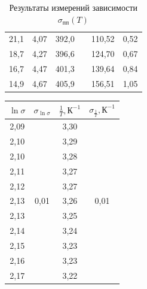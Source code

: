 \documentclass[a4paper,12pt]{report}
\begin{document}
\begin{table}[h!]
\begin{tabular}{|c|c|c|c|c|c|}
21,1      & 4,07 & 392,0 &                       & 110,52    & 0,52                   \\ \cline{1-3} \cline{5-6} 
18,7      & 4,27 & 396,6 &                       & 124,70    & 0,67                   \\ \cline{1-3} \cline{5-6} 
16,7      & 4,47 & 401,3 &                       & 139,64    & 0,84                   \\ \cline{1-3} \cline{5-6} 
14,9      & 4,67 & 405,9 &                       & 156,51    & 1,05                   \\ \hline
\end{tabular}
\caption{Результаты измерений зависимости $\sigma_{\text{пп}}(T)$}
\label{table_pp}
\end{table}

\begin{table}[h!]
\begin{tabular}{|c|c|c|c|}
\hline
$\ln\sigma$ & $\sigma_{\ln\sigma}$        & $\frac{1}{T}, \text{К}^{-1}$  & $\sigma_{\frac{1}{T}}, \text{К}^{-1}$              \\ \hline
2,09      & \multirow{36}{*}{0,01} & 3,30 & \multirow{36}{*}{0,01} \\ \cline{1-1} \cline{3-3}
2,10      &                        & 3,29 &                        \\ \cline{1-1} \cline{3-3}
2,10      &                        & 3,28 &                        \\ \cline{1-1} \cline{3-3}
2,11      &                        & 3,27 &                        \\ \cline{1-1} \cline{3-3}
2,12      &                        & 3,27 &                        \\ \cline{1-1} \cline{3-3}
2,13      &                        & 3,26 &                        \\ \cline{1-1} \cline{3-3}
2,13      &                        & 3,25 &                        \\ \cline{1-1} \cline{3-3}
2,14      &                        & 3,24 &                        \\ \cline{1-1} \cline{3-3}
2,15      &                        & 3,23 &                        \\ \cline{1-1} \cline{3-3}
2,16      &                        & 3,23 &                        \\ \cline{1-1} \cline{3-3}
2,17      &                        & 3,22 &                        \\ \cline{1-1} \cline{3-3}

\end{tabular}
\end{table}
\end{document}
